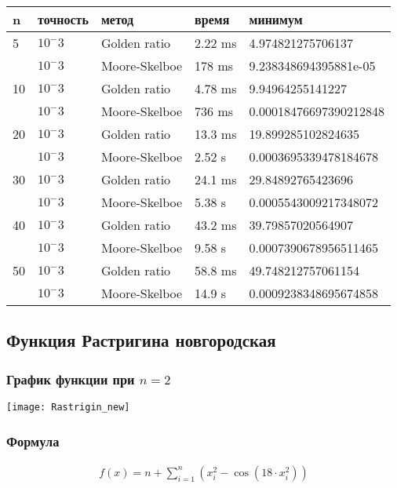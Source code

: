     \begin{tabular}{ |p{2cm}|p{2cm}|p{3cm}|p{2cm}|p{4cm}|  }
        \hline
        n  & точность & метод         & время   & минимум                \\
        \hline
        5  & $10^-3$  & Golden ratio  & 2.22 ms & 4.974821275706137      \\\cline{2-5}
        & $10^-3$  & Moore-Skelboe & 178 ms  & 9.238348694395881e-05  \\
        \hline
        10 & $10^-3$  & Golden ratio  & 4.78 ms & 9.94964255141227       \\\cline{2-5}
        & $10^-3$  & Moore-Skelboe & 736 ms  & 0.00018476697390212848 \\
        \hline
        20 & $10^-3$  & Golden ratio  & 13.3 ms & 19.899285102824635     \\\cline{2-5}
        & $10^-3$  & Moore-Skelboe & 2.52 s  & 0.0003695339478184678  \\
        \hline
        30 & $10^-3$  & Golden ratio  & 24.1 ms & 29.84892765423696      \\\cline{2-5}
        & $10^-3$  & Moore-Skelboe & 5.38 s  & 0.0005543009217348072  \\
        \hline
        40 & $10^-3$  & Golden ratio  & 43.2 ms & 39.79857020564907      \\\cline{2-5}
        & $10^-3$  & Moore-Skelboe & 9.58 s  & 0.0007390678956511465  \\
        \hline
        50 & $10^-3$  & Golden ratio  & 58.8 ms & 49.748212757061154     \\\cline{2-5}
        & $10^-3$  & Moore-Skelboe & 14.9 s  & 0.0009238348695674858  \\
        \hline

    \end{tabular}

    \subsection*{Функция Растригина новгородская}

    \subsubsection*{График функции при $n=2$}
    \texttt{[image: Rastrigin\_new]}

    \subsubsection*{Формула}
    \begin{gather*}
        f(x)=n+\sum_{i=1}^n\left(x_i^2-\cos \left(18 \cdot x_i^2\right)\right)
    \end{gather*}

